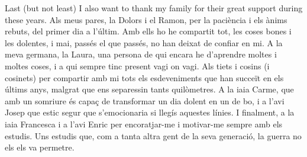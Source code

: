 Last (but not least) I also want to thank my family for their great support during these years.
Als meus pares, la Dolors i el Ramon, per la paci\`{e}ncia i els \`{a}nims rebuts, del primer dia a l'\'{u}ltim.
Amb ells ho he compartit tot, les coses bones i les dolentes, i mai, pass\'{e}s el que pass\'{e}s, no han deixat de confiar en mi.
A la meva germana, la Laura, una persona de qui encara he d'aprendre moltes i moltes coses, i a qui sempre tinc present vagi on vagi.
Als tiets i cosins (i cosinets) per compartir amb mi tots els esdeveniments que han succe\"{i}t en els \'{u}ltims anys, malgrat que ens separessin tants quil\`{o}metres.
A la iaia Carme, que amb un somriure \'{e}s capa\c{c} de transformar un dia dolent en un de bo, i a l'avi Josep que estic segur que s'emocionaria si lleg\'{i}s aquestes l\'{i}nies.
I finalment, a la iaia Francesca i a l'avi Enric per encoratjar-me i motivar-me sempre amb els estudis.
Uns estudis que, com a tanta altra gent de la seva generaci\'{o}, la guerra no els els va permetre.
